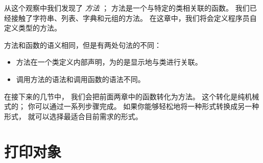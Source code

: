 从这个观察中我们发现了 {\em 方法} ； 方法是一个与特定的类相关联的函数。
我们已经接触了字符串、列表、字典和元组的方法。
在这章中，我们将会定义程序员自定义类型的方法。



方法和函数的语义相同，但是有两处句法的不同：


\begin{itemize}

\item 方法在一个类定义内部声明，为的是显示地与类进行关联。

\item 调用方法的语法和调用函数的语法不同。

\end{itemize}


在接下来的几节中， 我们会把前面两章中的函数转化为方法。
这个转化是纯机械式的； 你可以通过一系列步骤完成。
如果你能够轻松地将一种形式转换成另一种形式， 就可以选择最适合目前需求的形式。

\section{打印对象 }


